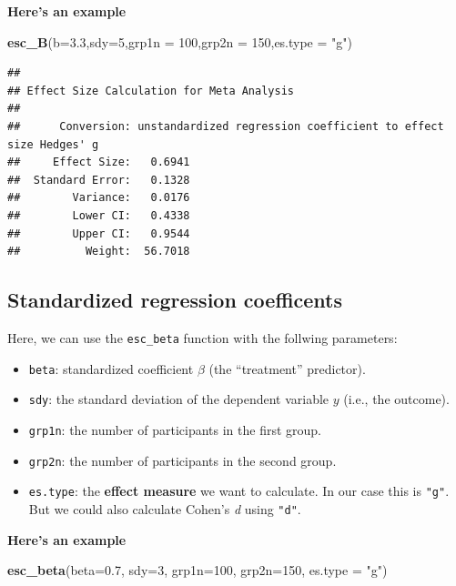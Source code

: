 \documentclass[]{book}
\newenvironment{Shaded}{\begin{snugshade}}{\end{snugshade}}
\newcommand{\DataTypeTok}[1]{\textcolor[rgb]{0.13,0.29,0.53}{#1}}
\newcommand{\DecValTok}[1]{\textcolor[rgb]{0.00,0.00,0.81}{#1}}
\newcommand{\FloatTok}[1]{\textcolor[rgb]{0.00,0.00,0.81}{#1}}
\newcommand{\KeywordTok}[1]{\textcolor[rgb]{0.13,0.29,0.53}{\textbf{#1}}}
\newcommand{\NormalTok}[1]{#1}
\newcommand{\StringTok}[1]{\textcolor[rgb]{0.31,0.60,0.02}{#1}}
\providecommand{\tightlist}{%
  \setlength{\itemsep}{0pt}\setlength{\parskip}{0pt}}
\begin{document}
\textbf{Here's an example}

\begin{Shaded}
\begin{Highlighting}[]
\KeywordTok{esc_B}\NormalTok{(}\DataTypeTok{b=}\FloatTok{3.3}\NormalTok{,}\DataTypeTok{sdy=}\DecValTok{5}\NormalTok{,}\DataTypeTok{grp1n =} \DecValTok{100}\NormalTok{,}\DataTypeTok{grp2n =} \DecValTok{150}\NormalTok{,}\DataTypeTok{es.type =} \StringTok{"g"}\NormalTok{)}
\end{Highlighting}
\end{Shaded}

\begin{verbatim}
## 
## Effect Size Calculation for Meta Analysis
## 
##      Conversion: unstandardized regression coefficient to effect size Hedges' g
##     Effect Size:   0.6941
##  Standard Error:   0.1328
##        Variance:   0.0176
##        Lower CI:   0.4338
##        Upper CI:   0.9544
##          Weight:  56.7018
\end{verbatim}

\hypertarget{standardized-regression-coefficents}{%
\subsection{Standardized regression coefficents}\label{standardized-regression-coefficents}}

Here, we can use the \texttt{esc\_beta} function with the follwing parameters:

\begin{itemize}
\tightlist
\item
  \texttt{beta}: standardized coefficient \(\beta\) (the ``treatment'' predictor).
\item
  \texttt{sdy}: the standard deviation of the dependent variable \(y\) (i.e., the outcome).
\item
  \texttt{grp1n}: the number of participants in the first group.
\item
  \texttt{grp2n}: the number of participants in the second group.
\item
  \texttt{es.type}: the \textbf{effect measure} we want to calculate. In our case this is \texttt{"g"}. But we could also calculate Cohen's \emph{d} using \texttt{"d"}.
\end{itemize}

\textbf{Here's an example}

\begin{Shaded}
\begin{Highlighting}[]
\KeywordTok{esc_beta}\NormalTok{(}\DataTypeTok{beta=}\FloatTok{0.7}\NormalTok{, }\DataTypeTok{sdy=}\DecValTok{3}\NormalTok{, }\DataTypeTok{grp1n=}\DecValTok{100}\NormalTok{, }\DataTypeTok{grp2n=}\DecValTok{150}\NormalTok{, }\DataTypeTok{es.type =} \StringTok{"g"}\NormalTok{)}
\end{Highlighting}
\end{Shaded}
\end{document}
